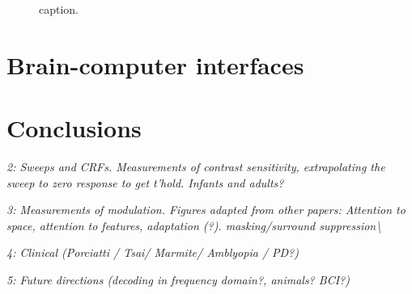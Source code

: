 \documentclass[
  letterpaper,
  DIV=11,
  numbers=noendperiod]{scrartcl}
\begin{document}
\begin{figure}


\caption{\label{fig-plotclinical}caption.}

\end{figure}%

\section{Brain-computer interfaces}\label{brain-computer-interfaces}

\section{Conclusions}\label{conclusions}

\emph{2: Sweeps and CRFs. Measurements of contrast sensitivity,
extrapolating the sweep to zero response to get t'hold. Infants and
adults?}

\emph{3: Measurements of modulation. Figures adapted from other papers:
Attention to space, attention to features, adaptation (?).
masking/surround suppression\textbackslash{}}

\emph{4: Clinical (Porciatti / Tsai/ Marmite/ Amblyopia / PD?)}

\emph{5: Future directions (decoding in frequency domain?, animals?
BCI?)}
\end{document}
